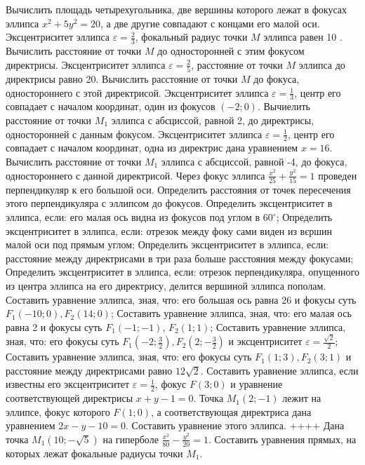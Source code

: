 Вычислить площадь четырехугольника, две вершины которого лежат в фокусах эллипса $x^2+5 y^2=20$, а две другие совпадают с концами его малой оси.
Эксцентриситет эллипса $\varepsilon=\frac{2}{3}$, фокальный радиус точки $M$ эллипса равен 10 . Вычислить расстояние от точки $M$ до односторонней с этим фокусом директрисы.
Эксцентриситет эллипса $\varepsilon=\frac{2}{5}$, расстояние от точки $M$ эллипса до директрисы равно 20. Вычислить расстояние от точки $M$ до фокуса, одностороннего с этой директрисой.
Эксцентриситет эллипса $\varepsilon=\frac{1}{3}$, центр его совпадает с началом координат, один из фокусов $(-2 ; 0)$. Вычиелить расстояние от точки $M_1$ эллипса с абсциссой, равной 2, до директрисы, односторонней с данным фокусом.
Эксцентриситет эллипса $\varepsilon=\frac{1}{2}$, центр его совпадает с началом координат, одна из директрис дана уравнением $x=16$. Вычислить расстояние от точки $M_1$ эллипса с абсциссой, равной -4, до фокуса, одностороннего с данной директрисой.
Через фокус эллипса $\frac{x^2}{25}+\frac{y^2}{15}=1$ проведен перпендикуляр к его большой оси. Определить расстояния от точек пересечения этого перпендикуляра с эллипсом до фокусов.
Определить эксцентриситет в эллипса, если: его малая ось видна из фокусов под углом в $60^{\circ}$;
Определить эксцентриситет в эллипса, если: отрезок между фоку сами виден из вєршин малой оси под прямым углом;
Определить эксцентриситет в эллипса, если: расстояние между директрисами в три раза больше расстояния между фокусами;
Определить эксцентриситет в эллипса, если: отрезок перпендикуляра, опущенного из центра эллипса на его директрису, делится вершиной эллипса пополам.
Составить уравнение эллипса, зная, что: его большая ось равна 26 и фокусы суть $F_1(-10 ; 0), F_2(14 ; 0)$;
Составить уравнение эллипса, зная, что: его малая ось равна 2 и фокусы суть $F_1(-1 ;-1)$, $F_2(1 ; 1)$;
Составить уравнение эллипса, зная, что: его фокусы суть $F_1\left(-2 ; \frac{3}{2}\right), F_2\left(2 ;-\frac{3}{2}\right)$ и эксцентриситет $\varepsilon=\frac{\sqrt{2}}{2}$;
Составить уравнение эллипса, зная, что: его фокусы суть $F_1(1 ; 3), F_2(3 ; 1)$ и расстояние между директрисами равно $12 \sqrt{2}$.
Составить уравнение эллипса, если известны его эксцентриситет $\varepsilon=\frac{1}{2}$, фокус $F(3 ; 0)$ и уравнение соответствующей директрисы $x+y-1=0$.
Точка $M_1(2 ;-1)$ лежит на эллипсе, фокус которого $F(1 ; 0)$, а соответствующая директриса дана уравнением $2 x-y-10=0$. Составить уравнение этого эллипса.
++++
Дана точка $M_1(10 ;-\sqrt{5})$ на гиперболе $\frac{x^2}{80}-\frac{y^2}{20}=1$. Составить уравнения прямых, на которых лежат фокальные радиусы точки $M_1$.
